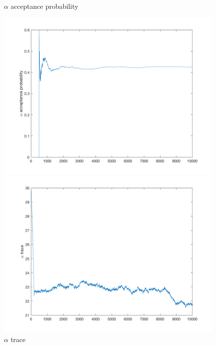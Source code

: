 \documentclass{siamart1116}
\begin{document}
\begin{figure}[!htb]
    \begin{minipage}{0.48\textwidth}
        \centering
        \caption{\label{fig:xi_1} $\alpha$ acceptance probability}
        \includegraphics[width=\linewidth]{graphics/centered/acceptance_alpha_probability.png}
    \end{minipage} \hfill
    \begin{minipage}{0.48\textwidth}
        \centering
        \caption{\label{fig:xi_2} $\alpha$ trace}
        \includegraphics[width=\linewidth]{graphics/centered/trace_alpha.png}
    \end{minipage}
\end{figure}
\end{document}
